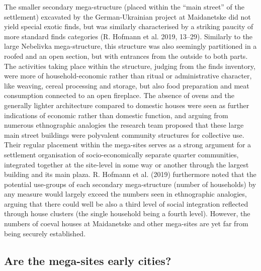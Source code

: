 \documentclass[
  12pt,
  a4paper, twoside]{book}
\begin{document}
The smaller secondary mega-structure (placed within the ``main street'' of the settlement) excavated by the German-Ukrainian project at Maidanetske did not yield special exotic finds, but was similarly characterised by a striking paucity of more standard finds categories (R. Hofmann et al. 2019, 13--29). Similarly to the large Nebelivka mega-structure, this structure was also seemingly partitioned in a roofed and an open section, but with entrances from the outside to both parts. The activities taking place within the structure, judging from the finds inventory, were more of household-economic rather than ritual or administrative character, like weaving, cereal processing and storage, but also food preparation and meat consumption connected to an open fireplace. The absence of ovens and the generally lighter architecture compared to domestic houses were seen as further indications of economic rather than domestic function, and arguing from numerous ethnographic analogies the research team proposed that these large main street buildings were polyvalent community structures for collective use. Their regular placement within the mega-sites serves as a strong argument for a settlement organisation of socio-economically separate quarter communities, integrated together at the site-level in some way or another through the largest building and its main plaza. R. Hofmann et al. (2019) furthermore noted that the potential use-groups of each secondary mega-structure (number of households) by any measure would largely exceed the numbers seen in ethnographic analogies, arguing that there could well be also a third level of social integration reflected through house clusters (the single household being a fourth level). However, the numbers of coeval houses at Maidanetske and other mega-sites are yet far from being securely established.

\hypertarget{are-the-mega-sites-early-cities}{%
\subsection{Are the mega-sites early cities?}\label{are-the-mega-sites-early-cities}}
\end{document}
